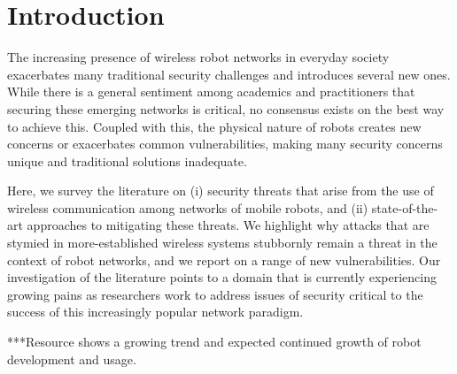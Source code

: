 



\section{Introduction}

\medskip

The increasing presence of wireless robot networks in everyday society exacerbates many traditional security challenges and introduces several new ones. While there is a general sentiment among academics and practitioners that securing these emerging networks is critical, no consensus exists on the best way to achieve this. Coupled with this, the physical nature of robots creates new concerns or exacerbates common vulnerabilities, making many security concerns unique and traditional solutions inadequate.

Here, we survey the literature on (i) security threats that arise from the use of wireless communication among networks of mobile robots, and (ii) state-of-the-art approaches to mitigating these threats. We highlight why attacks that are stymied in more-established wireless systems stubbornly remain a threat in the context of robot networks, and we report on a range of new vulnerabilities.  Our investigation of the literature points to a domain that is currently experiencing growing pains as researchers work to address issues of security critical to the success of this increasingly popular network paradigm.





***Resource shows a growing trend and expected continued growth of robot development and usage.  


